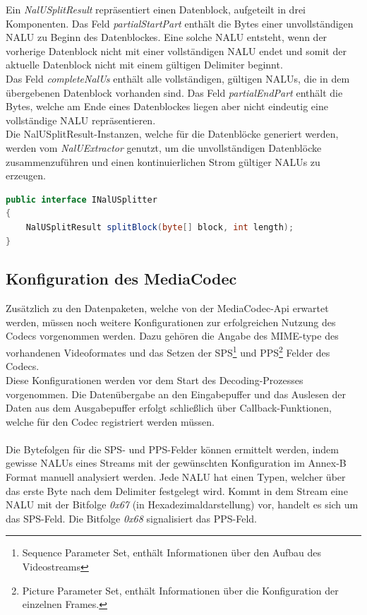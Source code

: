 Ein \textit{NalUSplitResult} repräsentiert einen Datenblock, aufgeteilt in drei Komponenten. Das Feld \textit{partialStartPart} enthält die Bytes einer unvollständigen NALU zu Beginn des Datenblockes. Eine solche NALU entsteht, wenn der vorherige Datenblock nicht mit einer vollständigen NALU endet und somit der aktuelle Datenblock nicht mit einem gültigen Delimiter beginnt.\\
Das Feld \textit{completeNalUs} enthält alle vollständigen, gültigen NALUs, die in dem übergebenen Datenblock vorhanden sind. Das Feld \textit{partialEndPart} enthält die Bytes, welche am Ende eines Datenblockes liegen aber nicht eindeutig eine vollständige NALU repräsentieren.\\
Die NalUSplitResult-Instanzen, welche für die Datenblöcke generiert werden, werden vom \textit{NalUExtractor} genutzt, um die unvollständigen Datenblöcke zusammenzuführen und einen kontinuierlichen Strom gültiger NALUs zu erzeugen.\\
\begin{lstlisting}[caption=Definition des INaluUSplitter-Interface, label=lst:i_nalu_splitter, language=Java]
public interface INalUSplitter 
{
    NalUSplitResult splitBlock(byte[] block, int length);
}
\end{lstlisting}

\subsection{Konfiguration des MediaCodec}
Zusätzlich zu den Datenpaketen, welche von der MediaCodec-Api erwartet werden, müssen noch weitere Konfigurationen zur erfolgreichen Nutzung des Codecs vorgenommen werden. Dazu gehören die Angabe des MIME-type des vorhandenen Videoformates und das Setzen der SPS\footnote{Sequence Parameter Set, enthält Informationen über den Aufbau des Videostreams} und PPS\footnote{Picture Parameter Set, enthält Informationen über die Konfiguration der einzelnen Frames.} Felder des Codecs.\\
Diese Konfigurationen werden vor dem Start des Decoding-Prozesses vorgenommen. Die Datenübergabe an den Eingabepuffer und das Auslesen der Daten aus dem Ausgabepuffer erfolgt schließlich über Callback-Funktionen, welche für den Codec registriert werden müssen. \\
\\
Die Bytefolgen für die SPS- und PPS-Felder können ermittelt werden, indem gewisse NALUs eines Streams mit der gewünschten Konfiguration im Annex-B Format manuell analysiert werden. Jede NALU hat einen Typen, welcher über das erste Byte nach dem Delimiter festgelegt wird. Kommt in dem Stream eine NALU mit der Bitfolge \textit{0x67} (in Hexadezimaldarstellung) vor, handelt es sich um das SPS-Feld. Die Bitfolge \textit{0x68} signalisiert das PPS-Feld. 

